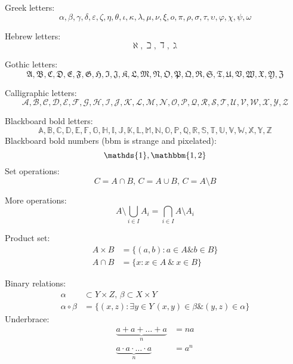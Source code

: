 \documentclass{article}
\DeclareMathOperator{\amp}{\&}
\begin{document}
Greek letters:
    \[
        \alpha, \beta, \gamma, \delta, \varepsilon, \zeta, \eta, \theta,
        \iota, \kappa, \lambda, \mu, \nu, \xi, o, \pi, \rho, \sigma, \tau, 
        \upsilon, \varphi, \chi, \psi, \omega   
    \]

Hebrew letters:
    \[
        \aleph, \beth, \daleth, \gimel   
    \]

Gothic letters:
    \[
        \mathfrak{A, B, C, D, E, F, G, H, I, J, K, L, M, N, O, P,
        Q, R, S, T, U, V, W, X, Y, Z}
    \]

Calligraphic letters:
    \[
        \mathcal{A, B, C, D, E, F, G, H, I, J, K, L, M, N, O, P, 
        Q, R, S, T, U, V, W, X, Y, Z}
    \]

Blackboard bold letters:
    \[
        \mathbb{A, B, C, D, E, F, G, H, I, J, K, L, M, N ,O, P,
        Q, R, S, T, U, V, W, X, Y, Z}
    \]
Blackboard bold numbers (bbm is strange and pixelated):
\[
    \mathds{1}, \mathbbm{1, 2}
    \]
Set operations:
    \[
        C = A\cap B,\, C = A\cup B, \, C = A\setminus B 
    \]

More operations:
    \[
    A\setminus \bigcup_{i\in I} A_i = \bigcap_{i\in I}A\setminus A_i 
    \]

Product set:
\begin{align*}
    A\times B &= \{ (a, b): a\in A \amp b\in B \} \\
    A\cap B &= \{ x: x\in A\:\&\: x\in B \}  
\end{align*}

Binary relations:
\begin{align*}
    \alpha&\subset Y\times Z, \, \beta\subset X\times Y\\
    \alpha\circ\beta &= \{(x, z): \exists y\in Y\, (x, y)\in\beta\amp (y, z)\in\alpha\} 
\end{align*}
Underbrace:
\begin{align*}
\underbrace{a+a+\ldots+a}_n &= na \\
\underbrace{a\cdot a\cdot\ldots\cdot a}_n &= a^n
\end{align*}
\end{document}

